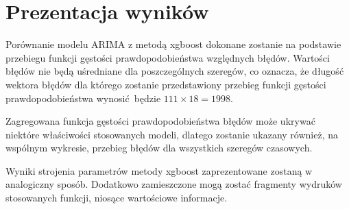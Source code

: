 \documentclass[11pt]{report}
\begin{document}
\section{Prezentacja wyników}
Porównanie modelu ARIMA z metodą xgboost dokonane zostanie na podstawie przebiegu funkcji gęstości prawdopodobieństwa względnych błędów.
Wartości błędów nie będą uśredniane dla poszczególnych szeregów, co oznacza, że długość wektora błędów dla którego zostanie przedstawiony przebieg funkcji gęstości prawdopodobieństwa wynosić będzie $111 \times 18 = 1998$.

Zagregowana funkcja gęstości prawdopodobieństwa błędów może ukrywać niektóre właściwości stosowanych modeli, dlatego zostanie ukazany również, na wspólnym  wykresie, przebieg błędów dla wszystkich szeregów czasowych.

Wyniki strojenia parametrów metody xgboost zaprezentowane zostaną w analogiczny sposób.
Dodatkowo zamieszczone mogą zostać fragmenty wydruków stosowanych funkcji, niosące wartościowe informacje.
\end{document}

